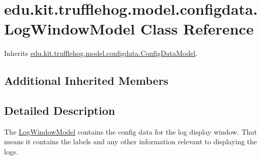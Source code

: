 \hypertarget{classedu_1_1kit_1_1trufflehog_1_1model_1_1configdata_1_1_log_window_model}{}\section{edu.\+kit.\+trufflehog.\+model.\+configdata.\+Log\+Window\+Model Class Reference}
\label{classedu_1_1kit_1_1trufflehog_1_1model_1_1configdata_1_1_log_window_model}


Inherits \hyperlink{classedu_1_1kit_1_1trufflehog_1_1model_1_1configdata_1_1_config_data_model}{edu.\+kit.\+trufflehog.\+model.\+configdata.\+Config\+Data\+Model}.

\subsection*{Additional Inherited Members}


\subsection{Detailed Description}
The \hyperlink{classedu_1_1kit_1_1trufflehog_1_1model_1_1configdata_1_1_log_window_model}{Log\+Window\+Model} contains the config data for the log display window. That means it contains the labels and any other information relevant to displaying the logs. 